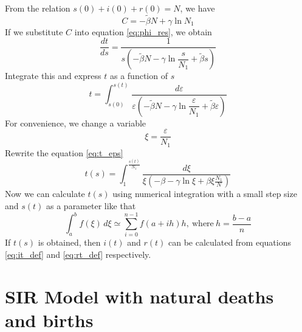 \documentclass[12pt, a4paper]{article}
\begin{document}
	\newpage
	
	From the relation $s(0) + i(0) + r(0) = N$, we have
	\begin{equation}
		C = -\tilde{\beta}N + \gamma \ln{N_1}
	\end{equation}
	If we substitute $C$ into equation \eqref{eq:phi_res}, we obtain
	\begin{equation}
		\frac{dt}{ds} = \frac{1}{s(-\tilde{\beta}N - \gamma \ln{\dfrac{s}{N_1} + \tilde{\beta}s})}
	\end{equation}
	Integrate this and express $t$ as a function of $s$
	\begin{equation} \label{eq:t_eps}
		t = \int_{s(0)}^{s(t)} \frac{d \varepsilon}{\varepsilon(-\tilde{\beta}N - \gamma \ln{\dfrac{\varepsilon}{N_1}} + \tilde{\beta} \varepsilon)}
	\end{equation}
	For convenience, we change a variable
	\begin{equation}
		\xi = \frac{\varepsilon}{N_1}
	\end{equation}
	Rewrite the equation \eqref{eq:t_eps}
	\begin{equation}
		t(s) = \int_{1}^{\frac{s(t)}{N_1}} \frac{d \xi}{\xi(-\beta - \gamma \ln{\xi} + \beta \xi \frac{N_1}{N})}		
	\end{equation}
	Now we can calculate $t(s)$ using numerical integration with a small step size and $s(t)$ as a parameter like that
	\begin{equation}
		\int_{a}^{b} f(\xi) \,d\xi \simeq \sum_{i=0}^{n-1} f(a + ih)h,~ \text{where} ~ h = \frac{b-a}{n}
	\end{equation}
	If $t(s)$ is obtained, then $i(t)$ and $r(t)$ can be calculated from equations \eqref{eq:it_def} and \eqref{eq:rt_def} respectively.
	
	\newpage

	\section{SIR Model with natural deaths and births}
\end{document}
